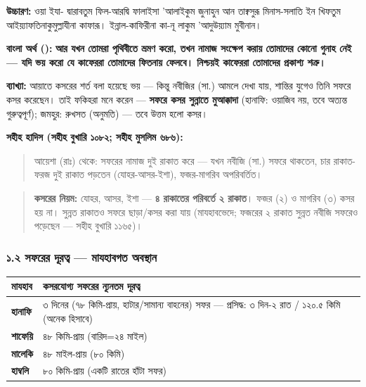 \textbf{উচ্চারণ:} ওয়া ইযা- দ্বারাবতুম ফিল-আরদ্বি ফালাইসা 'আলাইকুম জুনাহুন আন তাক্বসুরূ মিনাস-সলাতি ইন খিফতুম আইয়্যাফতিনাকুমুল্লাযীনা কাফারূ। ইন্নাল-কাফিরীনা কা-নূ লাকুম 'আদুউয়্যাম মুবীনান।

\textbf{বাংলা অর্থ ():}
\textbf{আর যখন তোমরা পৃথিবীতে ভ্রমণ করো, তখন নামাজ সংক্ষেপ করায় তোমাদের কোনো গুনাহ নেই — যদি ভয় করো যে কাফেররা তোমাদের ফিতনায় ফেলবে। নিশ্চয়ই কাফেররা তোমাদের প্রকাশ্য শত্রু।}

\textbf{ব্যাখ্যা:} আয়াতে কসরের শর্ত বলা হয়েছে ভয় — কিন্তু নবীজির (সা.) আমলে দেখা যায়, শান্তির যুগেও তিনি সফরে কসর করেছেন। তাই ফকিহরা মনে করেন — \textbf{সফরে কসর সুন্নাতে মুআক্কাদা} (হানাফি: ওয়াজিব নয়, তবে অত্যন্ত গুরুত্বপূর্ণ); জমহুর: রুখসত (অনুমতি) — তবে উত্তম হলো কসর।

\textbf{সহীহ হাদিস (সহীহ বুখারি ১০৮২; সহীহ মুসলিম ৬৮৬):}

\begin{quote}
আয়েশা (রাঃ) থেকে: সফরের নামাজ দুই রাকাত করে — যখন নবীজি (সা.) সফরে থাকতেন, চার রাকাত-ফরজ দুই রাকাত পড়তেন (যোহর-আসর-ইশা), ফজর-মাগরিব অপরিবর্তিত।
\end{quote}

\begin{quote}
\textbf{কসরের নিয়ম:} যোহর, আসর, ইশা — \textbf{৪ রাকাতের পরিবর্তে ২ রাকাত}। ফজর (২) ও মাগরিব (৩) কসর হয় না। সুন্নত রাকাতও সফরে ছাড়া/কসর করা যায় (মাযহাবভেদে; ফজরের ২ রাকাত সুন্নত নবীজি সফরেও পড়েছেন — সহীহ বুখারি ১১৬৫)।
\end{quote}

\subsubsection*{১.২ সফরের দূরত্ব — মাযহাবগত অবস্থান}

\begin{table}[h]\centering\small
\begin{tabular}{ll}
মাযহাব & কসরযোগ্য সফরের ন্যূনতম দূরত্ব \\
\hline
\textbf{হানাফি} & ৩ দিনের (৭৮ কিমি-প্রায়, হাটার/সামান্য বাহনের) সফর — প্রসিদ্ধ: ৩ দিন-২ রাত / ১২০.৫ কিমি (অনেক হিসাবে) \\
\textbf{শাফেয়ি} & ৪৮ কিমি-প্রায় (বারিদ=২৪ মাইল) \\
\textbf{মালেকি} & ৪৮ মাইল-প্রায় (৮০ কিমি) \\
\textbf{হাম্বলি} & ৮০ কিমি-প্রায় (একটি রাতের হাঁটা সফর) \\
\hline
\end{tabular}
\end{table}

